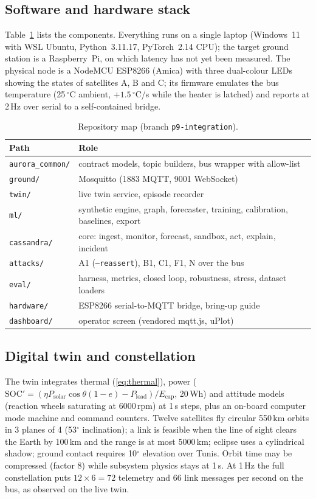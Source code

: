 \documentclass[conference]{IEEEtran}
\newcommand{\file}[1]{\texttt{#1}}
\newcommand{\degC}{$^{\circ}$C}
\begin{document}
\subsection{Software and hardware stack}
Table~\ref{tab:stack} lists the components. Everything runs on a single laptop (Windows~11 with WSL
Ubuntu, Python~3.11.17, PyTorch~2.14 CPU); the target ground station is a Raspberry~Pi, on which
latency has not yet been measured. The physical node is a NodeMCU ESP8266 (Amica) with three
dual-colour LEDs showing the states of satellites A, B and C; its firmware emulates the bus temperature
(25\,\degC{} ambient, $+1.5$\,\degC/s while the heater is latched) and reports at 2\,Hz over serial to a
self-contained bridge.

\begin{table}[t]
\caption{Repository map (branch \texttt{p9-integration}).}
\label{tab:stack}
\centering
\footnotesize
\setlength{\tabcolsep}{3pt}
\begin{tabular}{@{}p{22mm}p{58mm}@{}}
\toprule
Path & Role \\
\midrule
\file{aurora\_common/} & contract models, topic builders, bus wrapper with allow-list \\
\file{ground/} & Mosquitto (1883 MQTT, 9001 WebSocket) \\
\file{twin/} & live twin service, episode recorder \\
\file{ml/} & synthetic engine, graph, forecaster, training, calibration, baselines, export \\
\file{cassandra/} & core: ingest, monitor, forecast, sandbox, act, explain, incident \\
\file{attacks/} & A1 (\texttt{--reassert}), B1, C1, F1, N over the bus \\
\file{eval/} & harness, metrics, closed loop, robustness, stress, dataset loaders \\
\file{hardware/} & ESP8266 serial-to-MQTT bridge, bring-up guide \\
\file{dashboard/} & operator screen (vendored mqtt.js, uPlot) \\
\bottomrule
\end{tabular}
\end{table}

\subsection{Digital twin and constellation}
The twin integrates thermal (\ref{eq:thermal}), power
($\mathrm{SOC}'=(\eta P_{\mathrm{solar}}\cos\theta(1-e)-P_{\mathrm{load}})/E_{\mathrm{cap}}$, 20\,Wh)
and attitude models (reaction wheels saturating at 6000\,rpm) at 1\,s steps, plus an on-board computer
mode machine and command counters. Twelve satellites fly circular 550\,km orbits in 3 planes of 4
(53$^{\circ}$ inclination); a link is feasible when the line of sight clears the Earth by 100\,km and the
range is at most 5000\,km; eclipse uses a cylindrical shadow; ground contact requires 10$^{\circ}$
elevation over Tunis. Orbit time may be compressed (factor 8) while subsystem physics stays at 1\,s.
At 1\,Hz the full constellation puts $12\times6=72$ telemetry and 66 link messages per second on the bus, as observed on the live twin.
\end{document}
